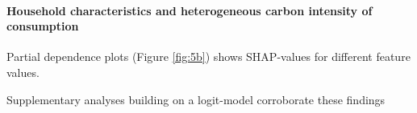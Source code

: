 \documentclass[12pt, a4paper]{article}
\newenvironment{subcaption2}
{\strut
\vspace{-5pt}
\begin{minipage}[b]{0.9\textwidth}
  \hspace*{-\parindent}
  \footnotesize}
 {\end{minipage}}
\begin{document}
\paragraph{Household characteristics and heterogeneous carbon intensity of consumption}

Partial dependence plots (Figure \ref{fig:5b}) shows SHAP-values for different feature values. 

Supplementary analyses building on a logit-model corroborate these findings



\end{document}
